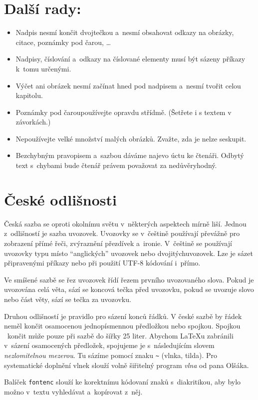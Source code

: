 \documentclass[a4paper, twocolumn, 10pt]{article}
\begin{document}
\section{Další rady:}
\label{sec:tips}

\begin{itemize}
  \setlength\itemsep{0em}
  \item Nadpis nesmí končit dvojtečkou a~nesmí obsahovat odkazy na obrázky, citace, poznámky pod čarou, \dots

  \medbreak

  \item Nadpisy, číslování a~odkazy na číslované elementy musí být sázeny příkazy k~tomu určenými.
  \item Výčet ani obrázek nesmí začínat hned pod nadpisem a~nesmí tvořit celou kapitolu.
  \item Poznámky pod čarou\footnotemark[1] používejte opravdu střídmě. (Šetřete i s textem v závorkách.)
  \item Nepoužívejte velké množství malých obrázků. Zvažte, zda je nelze seskupit.
  \item Bezchybným pravopisem a~sazbou dáváme najevo úctu ke čtenáři. Odbytý text s~chybami bude čtenář právem považovat za nedůvěryhodný.
\end{itemize}

\section{České odlišnosti}
\label{sec:differences}

Česká sazba se oproti okolnímu světu v~některých aspektech mírně liší. Jednou z~odlišností je sazba uvozovek. Uvozovky se v~češtině používají převážně pro zobrazení přímé řeči, zvýraznění přezdívek a~ironie. V~češtině se používají uvozovky typu  místo ``anglických'' uvozovek nebo \textquotedbl dvojitých\textquotedbl uvozovek. Lze je sázet připravenými příkazy nebo při použití UTF-8 kódování i~přímo.
\par
Ve smíšené sazbě se řez uvozovek řídí řezem prvního uvozovaného slova. Pokud je uvozována celá věta, sází se koncová tečka před uvozovku, pokud se uvozuje slovo nebo část věty, sází se tečka za uvozovku.
\par
Druhou odlišností je pravidlo pro sázení konců řádků. V české sazbě by řádek neměl končit osamocenou jednopísmennou předložkou nebo spojkou. Spojkou ~končit může pouze při sazbě do šířky 25 liter. Abychom \LaTeX u zabránili v~sázení osamocených předložek, spojujeme je s~následujícím slovem \emph{nezlomitelnou mezerou}. Tu sázíme pomocí znaku \verb|~| (vlnka, tilda). Pro systematické doplnění vlnek slouží volně šiřitelný program \emph{vlna} od pana Olšáka\footnotemark[2].
\par
Balíček \texttt{fontenc} slouží ke korektnímu kódovaní znaků s~diakritikou, aby bylo možno v~textu vyhledávat a~kopírovat z~něj.
\end{document}
